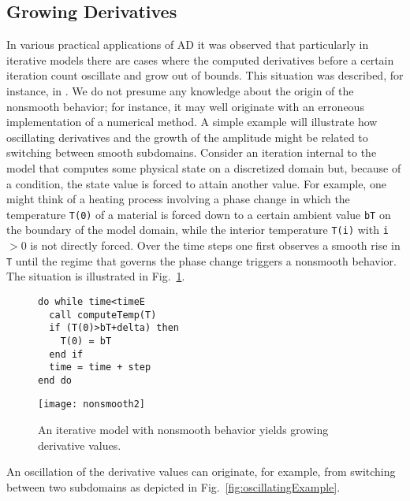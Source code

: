 \documentclass{article}
\newcommand{\reffig}[1]{{Fig.~\ref{#1}}}
\begin{document}
\subsection{Growing Derivatives}\label{sec:GrowingDerivatives}
In various practical applications of AD it was observed that particularly in iterative
models there are cases where the  computed derivatives before a certain iteration count 
oscillate and grow out of bounds. 
This situation was described, for instance, in \cite{tfs-delayed}. 
We do not presume any knowledge about the origin of the nonsmooth behavior; for instance,
it may well originate with an erroneous implementation of a numerical method. 
A simple example will illustrate how oscillating derivatives and the growth 
of the amplitude might be related to switching between smooth subdomains. 
Consider an iteration internal to the model that computes some physical state 
on a discretized domain but, because of a condition, the state value is 
forced to attain another value. For example, one might think of a heating process involving 
a phase change in which the temperature \lstinline{T(0)} of a 
material is forced down to a certain ambient 
value \lstinline{bT} on the boundary of the model domain, while 
the interior temperature \lstinline{T(i)} with \lstinline{i}$>0$ is not directly forced.  
Over the time steps  one first observes a smooth rise in \lstinline{T} 
until the 
regime that governs the phase change triggers a nonsmooth behavior. 
The situation is illustrated in \reffig{fig:growingExample}.
\begin{figure}
\begin{minipage}{.48\textwidth}
\begin{lstlisting}[frame=single,numbers=none,xleftmargin=0ex]
do while time<timeE
  call computeTemp(T)
  if (T(0)>bT+delta) then 
    T(0) = bT 
  end if
  time = time + step
end do  
\end{lstlisting}
\end{minipage}
\hfill
\begin{minipage}{.4\textwidth}
\texttt{[image: nonsmooth2]}
\end{minipage}
\caption{An iterative model with nonsmooth behavior yields 
growing derivative values.}\label{fig:growingExample} 
\end{figure}
An oscillation of the derivative values can originate, for example, from 
switching between two subdomains as depicted in  \reffig{fig:oscillatingExample}.
\end{document}
